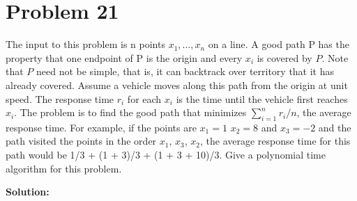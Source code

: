\documentclass{article}
\providecommand{\prob}[1]{\section*{Problem #1}}
\providecommand{\soln}{\textbf{Solution: }}
\begin{document}
\pagebreak
\prob{21}
The input to this problem is n points $x_1, \dots , x_n$ on a line. A good path P has the property that one endpoint of P is the origin and every $x_i$ is covered by $P$. Note that $P$ need not be simple, that is, it can backtrack over territory that it has already covered. Assume a vehicle moves along this path from the origin at unit speed. The response time $r_i$ for each $x_i$ is the time until the vehicle first reaches $x_i$. The problem is to find the good path that minimizes $\sum_{i=1}^n r_i/n$, the average response time.
For example, if the points are $x_1 = 1$ $x_2 = 8$ and $x_3 = −2$ and the path visited the points in the order $x_1$, $x_3$, $x_2$, the average response time for this path would be 1/3 + (1 + 3)/3 + (1 + 3 + 10)/3. Give a polynomial time algorithm for this problem.

\soln
\end{document}
